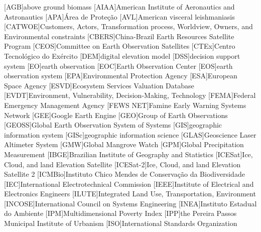 \begin{acronym}[HyperLEAVES] \itemsep0pt \setlength{\parskip}{0pt}
[AGB]{above ground biomass}
[AIAA]{American Institute of Aeronautics and Astronautics}
[APA]{Área de Proteção}
[AVL]{American visceral leishmaniasis}
[CATWOE]{Customers, Actors, Transformation process, Worldview, Owners, and Environmental constraints}
[CBERS]{China-Brazil Earth Resources Satellite Program}
[CEOS]{Committee on Earth Observation Satellites}
[CTEx]{Centro Tecnológico do Exército}
[DEM]{digital elevation model}
[DSS]{decision support system}
[EO]{earth observation}
[EOC]{Earth Observation Center}
[EOS]{earth observation system}
[EPA]{Environmental Protection Agency}
[ESA]{European Space Agency}
[ESVD]{Ecosystem Services Valuation Database}
[EVDT]{Environment, Vulnerability, Decision-Making, Technology}
[FEMA]{Federal Emergency Management Agency}
[FEWS NET]{Famine Early Warning Systems Network}
[GEE]{Google Earth Engine}
[GEO]{Group of Earth Observations}
[GEOSS]{Global Earth Observation System of Systems}
[GIS]{geographic information system}
[GISc]{geographic information science}
[GLAS]{Geoscience Laser Altimeter System}
[GMW]{Global Mangrove Watch}
[GPM]{Global Precipitation Measurement}
[IBGE]{Brazilian Institute of Geography and Statistics}
[ICESat]{Ice, Cloud, and land Elevation Satellite}
[ICESat-2]{Ice, Cloud, and land Elevation Satellite 2}
[ICMBio]{Instituto Chico Mendes de Conservação da Biodiversidade}
[IEC]{International Electrotechnical Commission}
[IEEE]{Institute of Electrical and Electronics Engineers}
[ILUTE]{Integrated Land Use, Transportation, Environment}
[INCOSE]{International Council on Systems Engineering}
[INEA]{Instituto Estadual do Ambiente}
[IPM]{Multidimensional Poverty Index}
[IPP]{the Pereira Passos Municipal Institute of Urbanism}
[ISO]{International Standards Organization}

\end{acronym}
